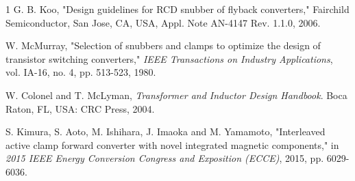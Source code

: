 \documentclass[lettersize,journal]{IEEEtran}
\begin{document}
\begin{thebibliography}{1}
G. B. Koo, "Design guidelines for RCD snubber of flyback converters," Fairchild Semiconductor, San Jose, CA, USA, Appl. Note AN-4147 Rev. 1.1.0, 2006.

W. McMurray, "Selection of snubbers and clamps to optimize the design of transistor switching converters," \textit{IEEE Transactions on Industry Applications}, vol. IA-16, no. 4, pp. 513-523, 1980.

W. Colonel and T. McLyman, \textit{Transformer and Inductor Design Handbook}. Boca Raton, FL, USA: CRC Press, 2004.

S. Kimura, S. Aoto, M. Ishihara, J. Imaoka and M. Yamamoto, "Interleaved active clamp forward converter with novel integrated magnetic components," in \textit{2015 IEEE Energy Conversion Congress and Exposition (ECCE)}, 2015, pp. 6029-6036.

\end{thebibliography}

%
\vfill
\end{document}
